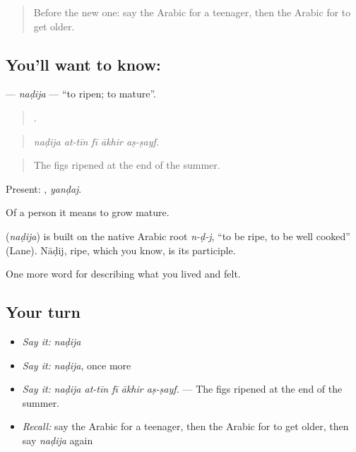 \label{lesson:AR-C531-nadija}



\begin{quote}
Before the new one: say the Arabic for a teenager, then the Arabic for to get older.
\end{quote}

\subsection*{You'll want to know: }
\textbf{} — \emph{naḍija} — \textquotedblleft{}to ripen; to mature\textquotedblright{}.

\begin{quote}
    .
\end{quote}

\begin{quote}
\emph{naḍija at-tīn fī ākhir aṣ-ṣayf.}
\end{quote}

\begin{quote}
The figs ripened at the end of the summer.
\end{quote}

Present: , \emph{yanḍaj}.

Of a person it means to grow mature.

\begin{cousinweb}
\textbf{} (\emph{naḍija}) is built on the native Arabic root \emph{n-ḍ-j}, \textquotedblleft{}to be ripe, to be well cooked\textquotedblright{} (Lane). Nāḍij, ripe, which you know, is its participle.
\end{cousinweb}

\begin{grammarlens}[title={What you've built}]
One more word for describing what you lived and felt.
\end{grammarlens}

\subsection*{Your turn}
\begin{itemize}
\raggedright
  \item \emph{Say it:} \emph{naḍija}
  \item \emph{Say it:} \emph{naḍija}, once more
  \item \emph{Say it:} \emph{naḍija at-tīn fī ākhir aṣ-ṣayf.} — The figs ripened at the end of the summer.
  \item \emph{Recall:} say the Arabic for a teenager, then the Arabic for to get older, then say \emph{naḍija} again
\end{itemize}

